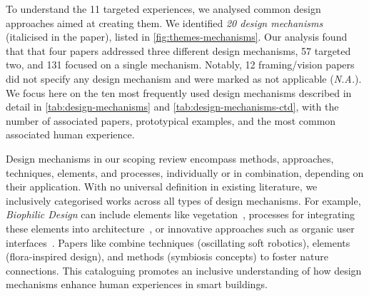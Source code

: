 


To understand the 11 targeted experiences, we analysed common design approaches aimed at creating them. We identified \emph{20 design mechanisms} (italicised in the paper), listed in \autoref{fig:themes-mechanisms}. Our analysis found that that four papers addressed three different design mechanisms, 57 targeted two, and 131 focused on a single mechanism. Notably, 12 framing/vision papers did not specify any design mechanism and were marked as not applicable (\textit{N.A.}). We focus here on the ten most frequently used design mechanisms described in detail in  \autoref{tab:design-mechanisms} and \autoref{tab:design-mechanisms-ctd}, with the number of associated papers, prototypical examples, and the most common associated human experience.

Design mechanisms in our scoping review encompass methods, approaches, techniques, elements, and processes, individually or in combination, depending on their application. With no universal definition in existing literature, we inclusively categorised works across all types of design mechanisms. For example, \textit{Biophilic Design} can include elements like vegetation~\cite{loh2010please}, processes for integrating these elements into architecture~\cite{buechley2010living}, or innovative approaches such as organic user interfaces~\cite{nabil2017designing}. Papers like \citet{chooi2022symbiosis} combine techniques (oscillating soft robotics), elements (flora-inspired design), and methods (symbiosis concepts) to foster nature connections. This cataloguing promotes an inclusive understanding of how design mechanisms enhance human experiences in smart buildings.


